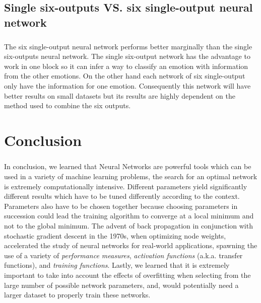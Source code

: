 \documentclass[a4paper,12pt,oneside,final]{report}
\begin{document}
\section{Single six-outputs VS. six single-output neural network}
\paragraph{}
The six single-output neural network performs better marginally than the single six-outputs neural network. The single six-output network has the advantage to work in one block so it can infer a way to classify an emotion with information from the other emotions. On the other hand each network of six single-output only have the information for one emotion. Consequently this network will have better results on small datasets but its results are highly dependent on the method used to combine the six outputs.
\chapter{Conclusion}
\paragraph{}
In conclusion, we learned that Neural Networks are powerful tools which can be used in a variety of machine learning problems, the search for an optimal network is extremely computationally intensive.  Different parameters yield significantly different results which have to be tuned differently according to the context. Parameters also have to be chosen together because choosing parameters in succession could lead the training algorithm to converge at a local minimum and not to the global minimum. The advent of back propagation in conjunction with stochastic gradient descent in the 1970s, when optimizing node weights, accelerated the study of neural networks for real-world applications, spawning the use of a variety of \emph{performance measures}, \emph{activation functions} (a.k.a. transfer functions), and \emph{training functions}.  Lastly, we learned that it is extremely important to take into account the effects of overfitting when selecting from the large number of possible network parameters, and, would potentially need a larger dataset to properly train these networks.




\begin{appendices}

\end{appendices}
\end{document}
